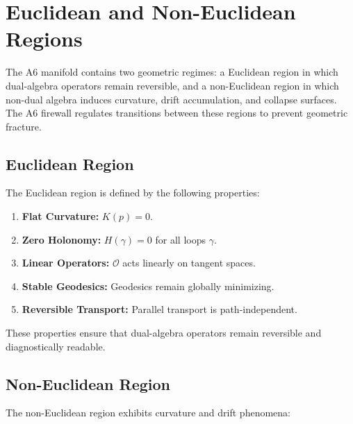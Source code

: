 
\section{Euclidean and Non-Euclidean Regions}

The A6 manifold contains two geometric regimes: a Euclidean region in which
dual-algebra operators remain reversible, and a non-Euclidean region in which
non-dual algebra induces curvature, drift accumulation, and collapse surfaces.
The A6 firewall regulates transitions between these regions to prevent
geometric fracture.

\subsection{Euclidean Region}

The Euclidean region is defined by the following properties:

\begin{enumerate}
    \item \textbf{Flat Curvature:} $K(p) = 0$.
    \item \textbf{Zero Holonomy:} $H(\gamma) = 0$ for all loops $\gamma$.
    \item \textbf{Linear Operators:} $\mathcal{O}$ acts linearly on tangent
          spaces.
    \item \textbf{Stable Geodesics:} Geodesics remain globally minimizing.
    \item \textbf{Reversible Transport:} Parallel transport is path-independent.
\end{enumerate}

These properties ensure that dual-algebra operators remain reversible and
diagnostically readable.

\subsection{Non-Euclidean Region}

The non-Euclidean region exhibits curvature and drift phenomena:

